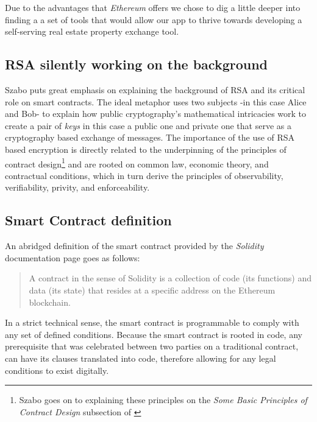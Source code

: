 \documentclass[submission,copyright,creativecommons]{eptcs}
\begin{document}
Due to the advantages that \textit{Ethereum} offers we chose to dig a little deeper into finding a a set of tools that would allow our app to thrive towards developing a self-serving real estate property exchange tool.

\subsection{RSA silently working on the background}
Szabo puts great emphasis on explaining the background of RSA\cite{milanov2009rsa} and its critical role on smart contracts.  The ideal metaphor uses two subjects -in this case Alice and Bob- to explain how public cryptography's mathematical intricacies work to create a pair of \textit{keys} in this case a public one and private one that serve as a cryptography based exchange of messages.  The importance of the use of RSA based encryption is directly related to the underpinning of the principles of contract design\footnote{Szabo goes on to explaining these principles on the \textit{Some Basic Principles of Contract Design} subsection of \cite{NickSzaboSmart}} and are rooted on common law, economic theory, and contractual conditions, which in turn derive the principles of observability, verifiability, privity, and enforceability.



\subsection{Smart Contract definition}
An abridged definition of the smart contract provided by the \textit{Solidity} documentation page goes as follows:
\begin{quote}
    A contract in the sense of Solidity is a collection of code (its functions) and data (its state) that resides at a specific address on the Ethereum blockchain.\cite{IntroductionSmartContracts}
\end{quote}
In a strict technical sense, the smart contract is programmable to comply with any set of defined conditions.  Because the smart contract is rooted in code, any prerequisite that was celebrated between two parties on a traditional contract, can have its clauses translated into code, therefore allowing for any legal conditions to exist digitally.
\end{document}
